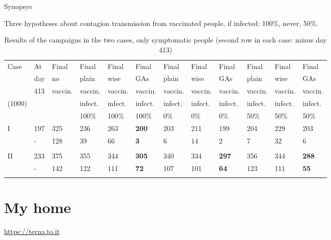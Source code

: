 \documentclass[8pt]{beamer}
\begin{document}
\begin{frame}{Synopsys}

Three hypotheses about contagion transmission from vaccinated people, if infected: 100\%, never, 50\%.

\medskip

\begin{table}[H]
\centering
\begin{scriptsize} %
\begin{tabular}{llllllllllll}
\toprule
Case    & At   & Final      & Final        & Final       & Final      & Final       & Final    & Final        & Final    & Final        & Final     \\
             & day & no         & plain       & wise        & GAs         & plain       & wise        & GAs         & plain       & wise        & GAs    \\
             & 413 & vaccin. & vaccin.    & vaccin.  & vaccin.  & vaccin.  & vaccin.  & vaccin.  & vaccin.  & vaccin.  & vaccin.  \\
 (1000) &        &              &  infect.  &  infect. &  infect. &  infect. &  infect. &  infect. &  infect. &  infect. &  infect.\\
             &       &              &  100\%   &  100\% &  100\% &  0\% &  0\% &  0\% & 50\% &  50\% &  50\% \\
\midrule
I            & 197 & 325 & 236 & 263 & \textbf{200} & 203 & 211   & 199 & 204 & 229 & 203 \\
             & -      & 128 & 39    & 66  & \textbf{3}    &  6     & 14  & 2     & 7     & 32 & 6 \\
\\
II           & 233 & 375 & 355 &  344 & \textbf{305}  & 340 & 334 & \textbf{297}  & 356 & 344 &  \textbf{288} \\
             & -      &  142 & 122 & 111 & \textbf{72}    & 107 & 101 & \textbf{64}   & 123   & 111 &  \textbf{55} \\
\\
\bottomrule  
\end{tabular}
\end{scriptsize}
\caption{Results of the campaigns in the two cases, only symptomatic people (second row in each case: minus day 413)}
\label{caseSynopsys}
\end{table}

\end{frame}

\section{My home}

\begin{frame}

\center
\begin{large}
\url{https://terna.to.it}
\end{large}

\end{frame}
\end{document}
